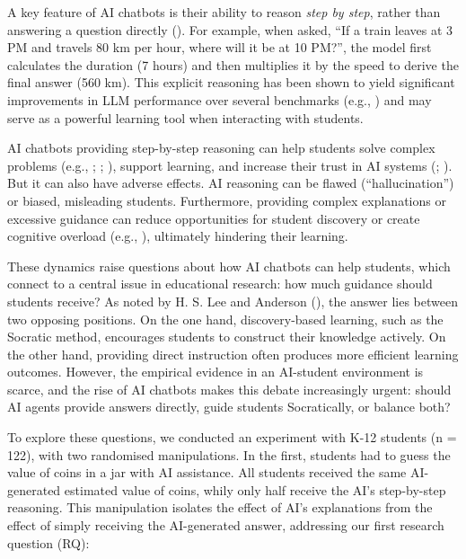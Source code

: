 \documentclass[
  12pt,
]{article}
\begin{document}
A key feature of AI chatbots is their ability to reason \emph{step by step}, rather than answering a question directly (). For example, when asked, ``If a train leaves at 3 PM and travels 80 km per hour, where will it be at 10 PM?'', the model first calculates the duration (7 hours) and then multiplies it by the speed to derive the final answer (560 km). This explicit reasoning has been shown to yield significant improvements in LLM performance over several benchmarks (e.g., ) and may serve as a powerful learning tool when interacting with students.

AI chatbots providing step-by-step reasoning can help students solve complex problems (e.g., ; ; ), support learning, and increase their trust in AI systems (; ). But it can also have adverse effects. AI reasoning can be flawed (``hallucination'') or biased, misleading students. Furthermore, providing complex explanations or excessive guidance can reduce opportunities for student discovery or create cognitive overload (e.g., ), ultimately hindering their learning.

These dynamics raise questions about how AI chatbots can help students, which connect to a central issue in educational research: how much guidance should students receive? As noted by H. S. Lee and Anderson (), the answer lies between two opposing positions. On the one hand, discovery-based learning, such as the Socratic method, encourages students to construct their knowledge actively. On the other hand, providing direct instruction often produces more efficient learning outcomes. However, the empirical evidence in an AI-student environment is scarce, and the rise of AI chatbots makes this debate increasingly urgent: should AI agents provide answers directly, guide students Socratically, or balance both?

To explore these questions, we conducted an experiment with K-12 students (n = 122), with two randomised manipulations. In the first, students had to guess the value of coins in a jar with AI assistance. All students received the same AI-generated estimated value of coins, whily only half receive the AI's step-by-step reasoning. This manipulation isolates the effect of AI's explanations from the effect of simply receiving the AI-generated answer, addressing our first research question (RQ):
\end{document}
